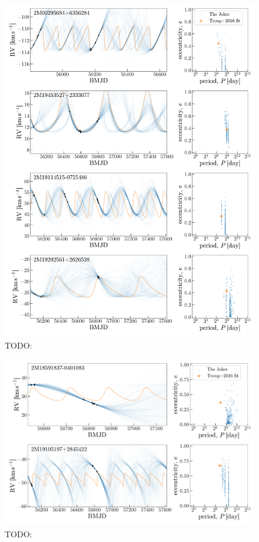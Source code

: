 \documentclass[modern, letterpaper]{aastex62}
\begin{document}
\begin{figure}[h]
\begin{center}
\includegraphics[width=\textwidth]{multimodal.pdf}
\end{center}
\caption{%
TODO:
\label{fig:troup-multimodal}
}
\end{figure}

\begin{figure}[h]
\begin{center}
\includegraphics[width=\textwidth]{data-changed.pdf}
\end{center}
\caption{%
TODO:
\label{fig:troup-datachanged}
}
\end{figure}
\end{document}
